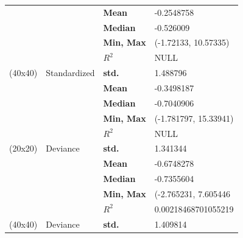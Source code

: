 \documentclass[12pt,a4paper,twoside]{article}
\begin{document}
\begin{longtable}{l|p{}|p{}|p{}}
                        &                                                               & \textbf{Mean}     & -0.2548758            \\
                        &                                                               & \textbf{Median}   & -0.526009             \\
                        &                                                               & \textbf{Min, Max} & (-1.72133, 10.57335)  \\
                        &                                                               & \textbf{$R^2$}    & NULL                  \\
    \hline
    (40x40)             & Standardized                                                  & \textbf{std.}     & 1.488796              \\
                        &                                                               & \textbf{Mean}     & -0.3498187            \\
                        &                                                               & \textbf{Median}   & -0.7040906            \\
                        &                                                               & \textbf{Min, Max} & (-1.781797, 15.33941) \\
                        &                                                               & \textbf{$R^2$}    & NULL                  \\
    \hline
    (20x20)             & Deviance                                                      & \textbf{std.}     & 1.341344              \\
                        &                                                               & \textbf{Mean}     & -0.6748278            \\
                        &                                                               & \textbf{Median}   & -0.7355604            \\
                        &                                                               & \textbf{Min, Max} & (-2.765231, 7.605446  \\
                        &                                                               & \textbf{$R^2$}    & 0.00218468701055219   \\
    \hline
    (40x40)             & Deviance                                                      & \textbf{std.}     & 1.409814              \\

\end{longtable}
\end{document}

